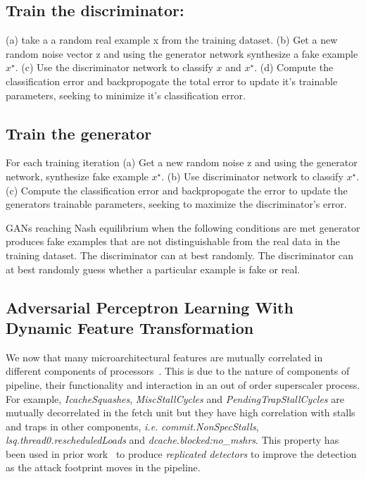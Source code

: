 
 
 
 
 
 
 
 






\subsection{Train the discriminator:}
(a) take a a random real example x from the training dataset. (b) Get a new random noise vector z and using the generator network synthesize a fake example  $x^{\star}$. (c) Use the discriminator network to classify  $x$ and  $x^{\star}$. (d) Compute the classification error and backpropogate the total error to update it's trainable parameters, seeking to minimize it's classification error. 

\subsection{Train the generator}
For each training iteration
(a) Get a new random noise z and using the generator network, synthesize fake example $x^{\star}$. (b) Use discriminator network to classify $x^{\star}$. (c) Compute the classification error and backpropogate the error to update the generators trainable parameters, seeking to maximize the discriminator's error. 

GANs reaching Nash equilibrium when the following conditions are met generator produces fake examples that are not distinguishable from the real data in the training dataset. The discriminator can at best randomly. The discriminator can at best randomly guess whether a particular example is fake or real.  

 
\subsection{Adversarial Perceptron Learning With Dynamic Feature Transformation}
We now that many microarchitectural features are mutually correlated in different components of processors~\cite{PerSpectron}. This is due to the nature of components of pipeline, their functionality and interaction in an out of order superscaler process. For example, \textit{IcacheSquashes}, \textit{MiscStallCycles} and \textit{PendingTrapStallCycles} 
are mutually decorrelated in the fetch unit but they have high correlation with stalls 
and traps in other components, {\em i.e.} \textit{commit.NonSpecStalls}, 
\textit{lsq.thread0.rescheduledLoads} and \textit{dcache.blocked:no\_mshrs}. This property has been used in prior work~\cite{PerSpectron} to produce {\em replicated detectors} to improve the detection as the attack footprint moves in the pipeline.


